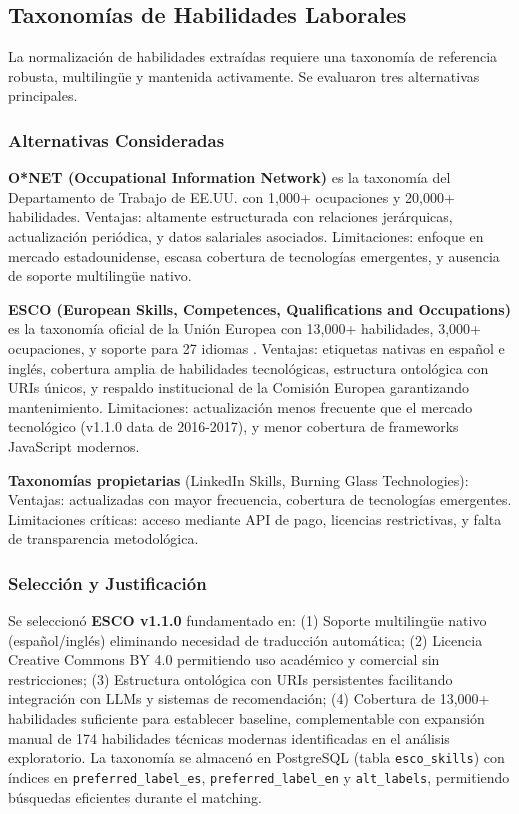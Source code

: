 \subsection{Taxonomías de Habilidades Laborales}

La normalización de habilidades extraídas requiere una taxonomía de referencia robusta, multilingüe y mantenida activamente. Se evaluaron tres alternativas principales.

\subsubsection{Alternativas Consideradas}

\textbf{O*NET (Occupational Information Network)} es la taxonomía del Departamento de Trabajo de EE.UU. con 1,000+ ocupaciones y 20,000+ habilidades. Ventajas: altamente estructurada con relaciones jerárquicas, actualización periódica, y datos salariales asociados. Limitaciones: enfoque en mercado estadounidense, escasa cobertura de tecnologías emergentes, y ausencia de soporte multilingüe nativo.

\textbf{ESCO (European Skills, Competences, Qualifications and Occupations)} es la taxonomía oficial de la Unión Europea con 13,000+ habilidades, 3,000+ ocupaciones, y soporte para 27 idiomas \cite{decorte2021}. Ventajas: etiquetas nativas en español e inglés, cobertura amplia de habilidades tecnológicas, estructura ontológica con URIs únicos, y respaldo institucional de la Comisión Europea garantizando mantenimiento. Limitaciones: actualización menos frecuente que el mercado tecnológico (v1.1.0 data de 2016-2017), y menor cobertura de frameworks JavaScript modernos.

\textbf{Taxonomías propietarias} (LinkedIn Skills, Burning Glass Technologies): Ventajas: actualizadas con mayor frecuencia, cobertura de tecnologías emergentes. Limitaciones críticas: acceso mediante API de pago, licencias restrictivas, y falta de transparencia metodológica.

\subsubsection{Selección y Justificación}

Se seleccionó \textbf{ESCO v1.1.0} fundamentado en: (1) Soporte multilingüe nativo (español/inglés) eliminando necesidad de traducción automática; (2) Licencia Creative Commons BY 4.0 permitiendo uso académico y comercial sin restricciones; (3) Estructura ontológica con URIs persistentes facilitando integración con LLMs y sistemas de recomendación; (4) Cobertura de 13,000+ habilidades suficiente para establecer baseline, complementable con expansión manual de 174 habilidades técnicas modernas identificadas en el análisis exploratorio. La taxonomía se almacenó en PostgreSQL (tabla \texttt{esco\_skills}) con índices en \texttt{preferred\_label\_es}, \texttt{preferred\_label\_en} y \texttt{alt\_labels}, permitiendo búsquedas eficientes durante el matching.

